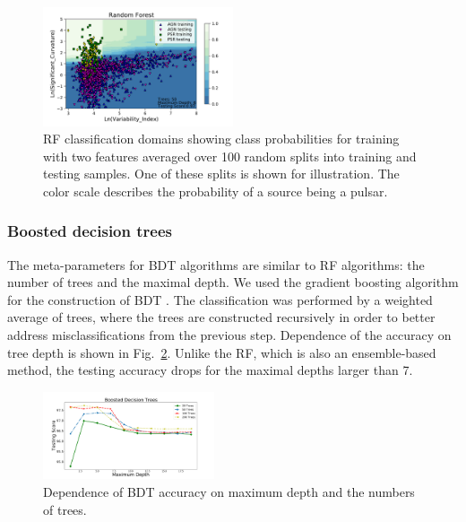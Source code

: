 \documentclass[referee]{aa} %
\newcommand{\twopicsp}{0.45}
\begin{document}
\begin{figure}[h]
\centering
\includegraphics[width=0.5\textwidth]{plots/classification_domains/rf_50_6_final.pdf}
\caption{RF classification domains showing class probabilities for training with two features
averaged over 100 random splits into training and testing samples.
One of these splits is shown for illustration.
The color scale describes the probability of a source being a pulsar.
}
\label{fig:RF_domains}
\end{figure}



\subsubsection{Boosted decision trees}

The meta-parameters for BDT algorithms are similar to RF algorithms: the number of trees and the maximal depth.
We used the gradient boosting algorithm for the construction of BDT \citep{gb}.
The classification was performed by a weighted average of trees, where the trees are constructed recursively in order to better address 
misclassifications from the previous step. 
Dependence of the accuracy on tree depth is shown in Fig.~\ref{fig:BDT_depth}. 
Unlike the RF, which is also an ensemble-based method, the testing accuracy drops for the maximal depths larger than 7. 


\begin{figure}[h]
\centering
\includegraphics[width=\twopicsp\textwidth]{plots/bdt_train_assocnewfeats.pdf}
\caption{Dependence of BDT accuracy on maximum depth and the numbers of trees.}
\label{fig:BDT_depth}
\end{figure}
\end{document}
